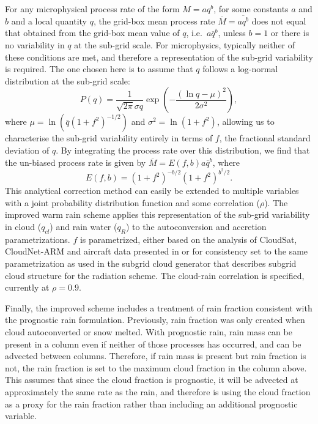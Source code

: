 \documentclass{UMDP_article}
\begin{document}
For any microphysical process rate of the form $M=aq^b$, for some
constants $a$ and $b$ and a local quantity $q$, the grid-box mean
process rate $\overline{M}=\overline{aq^b}$ does not equal that
obtained from the grid-box mean value of $q$, i.e.~$a\overline{q}^b$,
unless $b=1$ or there is no variability in $q$ at the sub-grid
scale. For microphysics, typically neither of these conditions are
met, and therefore a representation of the sub-grid variability is
required. The one chosen here is to assume that $q$ follows a
log-normal distribution at the sub-grid scale:
\begin{equation}\label{eq-lognorm}
  P(q)=\frac{1}{\sqrt{2\pi}\sigma q}\exp\left(-\frac{(\ln q-\mu)^2}{2\sigma^2}\right),
\end{equation}
where $\mu=\ln(\bar{q}(1+f^2)^{-1/2})$ and $\sigma^2=\ln(1+f^2)$,
allowing us to characterise the sub-grid variability entirely in terms
of $f$, the fractional standard deviation of $q$. By integrating the
process rate over this distribution, we find that the un-biased
process rate is given by $\overline{M}=E(f,b)a\overline{q}^b$, where
\begin{equation}\label{eq-lncorr}
  E(f,b)=(1+f^2)^{-b/2}(1+f^2)^{b^2/2}.
\end{equation}
This analytical correction method can easily be extended to multiple
variables with a joint probability distribution function and some
correlation ($\rho$). The improved warm rain scheme applies this
representation of the sub-grid variability in cloud ($q_{cl}$) and
rain water ($q_R$) to the autoconversion and accretion
parametrizations. $f$ is parametrized, either based on the analysis of
CloudSat, CloudNet-ARM and aircraft data presented in
\cite{boutle:etal:2014} or for consistency set to the same parametrization 
as used in the subgrid cloud generator that describes subgrid cloud structure 
for the radiation scheme. The cloud-rain correlation is specified,
currently at $\rho=0.9$.

Finally, the improved scheme includes a treatment of rain fraction
consistent with the prognostic rain formulation. Previously, rain
fraction was only created when cloud autoconverted or snow
melted. With prognostic rain, rain mass can be present in a column
even if neither of those processes has occurred, and can be advected
between columns. Therefore, if rain mass is present but rain fraction
is not, the rain fraction is set to the maximum cloud fraction in the
column above. This assumes that since the cloud fraction is
prognostic, it will be advected at approximately the same rate as the
rain, and therefore is using the cloud fraction as a proxy for the
rain fraction rather than including an additional prognostic variable.
\end{document}
